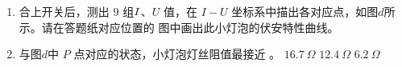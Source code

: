 \begin{enumerate}
\begin{enumerate}
\begin{enumerate}
\item 
合上开关后，测出 $ 9 $ 组$ \lmd{1} $、$ U $ 值，在 $ I-U $ 坐标系中描出各对应点，如图$ d $所示。请在答题纸对应位置的
图中画出此小灯泡的伏安特性曲线。


\item 
与图$ d $中 $ P $ 点对应的状态，小灯泡灯丝阻值最接近 \underlinegap 。
\threechoices
{$ 16.7 \ \Omega $}
{$ 12.4 \ \Omega $}
{$ 6.2 \ \Omega $}

\end{enumerate}


\end{enumerate}



\newpage


\end{enumerate}
